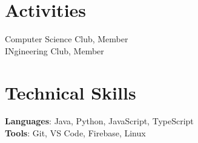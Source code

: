 \section{Activities}
 \begin{itemize}[leftmargin=0.15in, label={}]
    \small{\item{
     Computer Science Club, Member \\
     INgineering Club, Member
    }}
 \end{itemize}

\section{Technical Skills}
 \begin{itemize}[leftmargin=0.15in, label={}]
    \small{\item{
     \textbf{Languages}{: Java, Python, JavaScript, TypeScript} \\
     \textbf{Tools}{: Git, VS Code, Firebase, Linux}
    }}
 \end{itemize}

